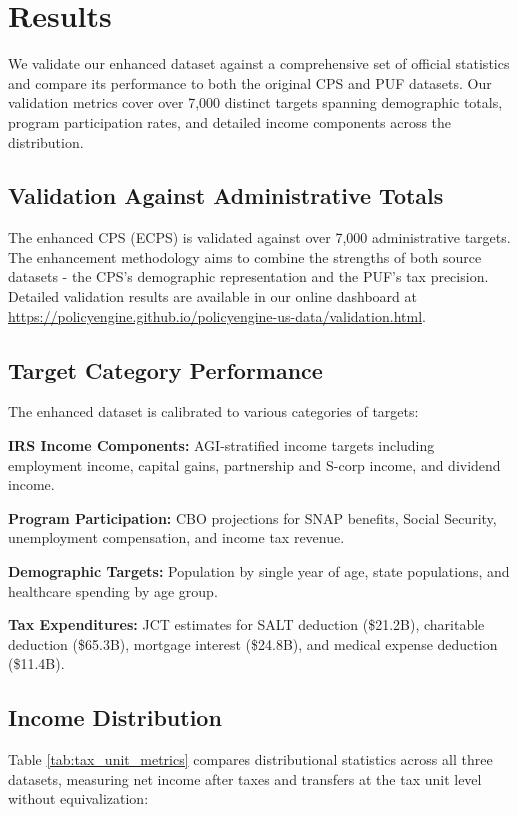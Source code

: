 \section{Results}

We validate our enhanced dataset against a comprehensive set of official statistics and compare its performance to both the original CPS and PUF datasets. Our validation metrics cover over 7,000 distinct targets spanning demographic totals, program participation rates, and detailed income components across the distribution.

\subsection{Validation Against Administrative Totals}

The enhanced CPS (ECPS) is validated against over 7,000 administrative targets. The enhancement methodology aims to combine the strengths of both source datasets - the CPS's demographic representation and the PUF's tax precision. Detailed validation results are available in our online dashboard at \url{https://policyengine.github.io/policyengine-us-data/validation.html}.

\subsection{Target Category Performance}

The enhanced dataset is calibrated to various categories of targets:

\textbf{IRS Income Components:} AGI-stratified income targets including employment income, capital gains, partnership and S-corp income, and dividend income.

\textbf{Program Participation:} CBO projections for SNAP benefits, Social Security, unemployment compensation, and income tax revenue.

\textbf{Demographic Targets:} Population by single year of age, state populations, and healthcare spending by age group.

\textbf{Tax Expenditures:} JCT estimates for SALT deduction (\$21.2B), charitable deduction (\$65.3B), mortgage interest (\$24.8B), and medical expense deduction (\$11.4B).

\subsection{Income Distribution}

Table \ref{tab:tax_unit_metrics} compares distributional statistics across all three datasets, measuring net income after taxes and transfers at the tax unit level without equivalization:

